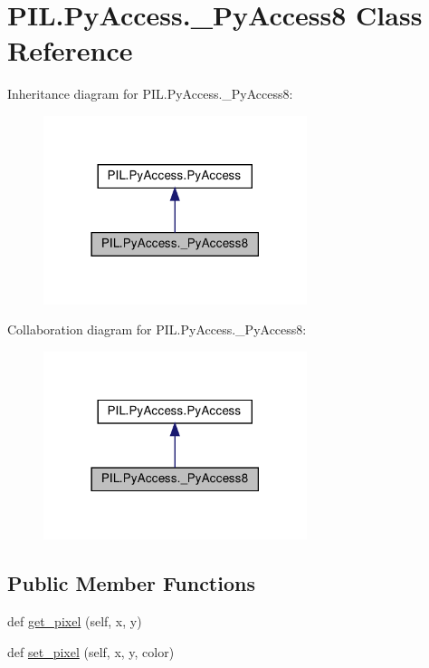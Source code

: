 \hypertarget{classPIL_1_1PyAccess_1_1__PyAccess8}{}\section{P\+I\+L.\+Py\+Access.\+\_\+\+Py\+Access8 Class Reference}
\label{classPIL_1_1PyAccess_1_1__PyAccess8}


Inheritance diagram for P\+I\+L.\+Py\+Access.\+\_\+\+Py\+Access8\+:
\nopagebreak
\begin{figure}[H]
\begin{center}
\leavevmode
\includegraphics[width=218pt]{classPIL_1_1PyAccess_1_1__PyAccess8__inherit__graph}
\end{center}
\end{figure}


Collaboration diagram for P\+I\+L.\+Py\+Access.\+\_\+\+Py\+Access8\+:
\nopagebreak
\begin{figure}[H]
\begin{center}
\leavevmode
\includegraphics[width=218pt]{classPIL_1_1PyAccess_1_1__PyAccess8__coll__graph}
\end{center}
\end{figure}
\subsection*{Public Member Functions}
\begin{DoxyCompactItemize}
\item 
def \hyperlink{classPIL_1_1PyAccess_1_1__PyAccess8_a36f885a43aca2ce1e2c2951e7490c773}{get\+\_\+pixel} (self, x, y)
\item 
def \hyperlink{classPIL_1_1PyAccess_1_1__PyAccess8_a01fc18c306196b451efe8c8b5ce009e9}{set\+\_\+pixel} (self, x, y, color)
\end{DoxyCompactItemize}
